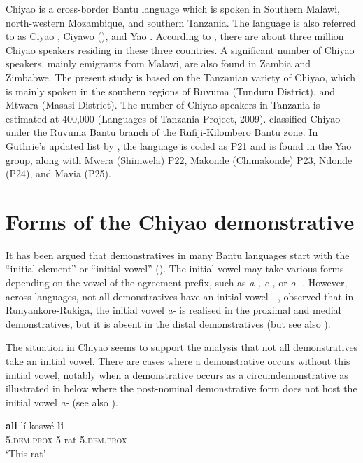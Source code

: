 \documentclass[output=paper,
            colorlinks, citecolor=brown
            ,draftmode
		  ]{langscibook}
\begin{document}
Chiyao is a cross-border Bantu language which is spoken in Southern Malawi, north-western Mozambique, and southern Tanzania. The language is also referred to as Ciyao \citep{Ngunga1997}, Ciyawo (\citealt{DicksDollar2010}), and Yao \citep{Whiteley1966}. According to \citet{Ngunga2002}, there are about three million Chiyao speakers residing in these three countries. A significant number of Chiyao speakers, mainly emigrants from Malawi, are also found in Zambia and Zimbabwe. The present study is based on the Tanzanian variety of Chiyao, which is mainly spoken in the southern regions of Ruvuma (Tunduru District), and Mtwara (Masasi District). The number of Chiyao speakers in Tanzania is estimated at 400,000 (Languages of Tanzania Project, 2009). \citet{NursePhilippson1980} classified Chiyao under the Ruvuma Bantu branch of the Rufiji-Kilombero Bantu zone. In Guthrie’s updated list by \citet{Maho2009}, the language is coded as P21 and is found in the Yao group, along with Mwera (Shimwela) P22, Makonde (Chimakonde) P23, Ndonde (P24), and Mavia (P25).  

\section{Forms of the Chiyao demonstrative}
\label{sec:taji:3}

It has been argued that demonstratives in many Bantu languages start with the ``initial element'' or ``initial vowel'' (\citealt{Wald1973, DuPlessis1978, DuPlessisVisser1992}). The initial vowel may take various forms depending on the vowel of the agreement prefix, such as \textit{a{}-, e{}-,} or \textit{o{}-} \citep{Visser2008}. However, across languages, not all demonstratives have an initial vowel \citep{Asiimwe2014}. \citet{Asiimwe2014}, observed that in Runyankore-Rukiga, the initial vowel \textit{a-} is realised in the proximal and medial demonstratives, but it is absent in the distal demonstratives (but see also ).

The situation in Chiyao seems to support the analysis that not all demonstratives take an initial vowel. There are cases where a demonstrative occurs without this initial vowel, notably when a demonstrative occurs as a circumdemonstrative as illustrated in  below where the post-nominal demonstrative form does not host the initial vowel \textit{a{}-} (see also ).

\ea%
    \label{ex:taji:6}
    \ea\label{ex:taji:6a} \gll  \textbf{ali}                          lí-koswé      \textbf{li}\\
      5.\textsc{dem.prox}      5-rat            5.\textsc{dem.prox}\\
      \glt ‘This rat’                
\end{document}
